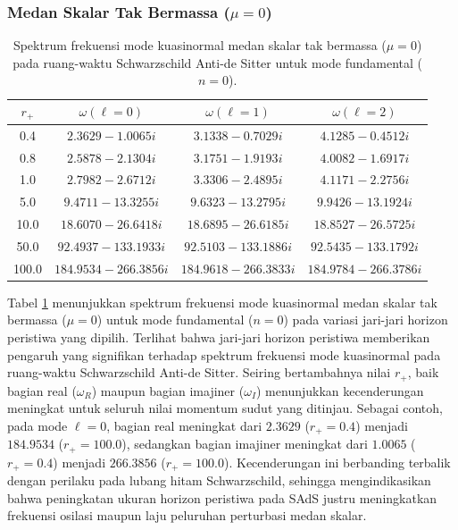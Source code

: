 \subsubsection*{Medan Skalar Tak Bermassa ($\mu=0$)}

\begin{table}[H]
\centering
\caption{Spektrum frekuensi mode kuasinormal medan skalar tak bermassa ($\mu=0$) pada ruang-waktu Schwarzschild Anti-de Sitter untuk mode fundamental ($n=0$).}
\vspace{0.2cm}
\renewcommand{\arraystretch}{1.25}
\begin{tabular}{cccc}
\toprule
$r_+$ & $\omega(\ell=0)$ & $\omega(\ell=1)$ & $\omega(\ell=2)$ \\
\midrule
0.4   & $2.3629 - 1.0065i$ & $3.1338 - 0.7029i$ & $4.1285 - 0.4512i$ \\
0.8   & $2.5878 - 2.1304i$ & $3.1751 - 1.9193i$ & $4.0082 - 1.6917i$ \\
1.0   & $2.7982 - 2.6712i$ & $3.3306 - 2.4895i$ & $4.1171 - 2.2756i$ \\
5.0   & $9.4711 - 13.3255i$ & $9.6323 - 13.2795i$ & $9.9426 - 13.1924i$ \\
10.0  & $18.6070 - 26.6418i$ & $18.6895 - 26.6185i$ & $18.8527 - 26.5725i$ \\
50.0  & $92.4937 - 133.1933i$ & $92.5103 - 133.1886i$ & $92.5435 - 133.1792i$ \\
100.0 & $184.9534 - 266.3856i$ & $184.9618 - 266.3833i$ & $184.9784 - 266.3786i$ \\
\bottomrule
\end{tabular}
\label{tab:sads_mu0_n0}
\end{table}

Tabel \ref{tab:sads_mu0_n0} menunjukkan spektrum frekuensi mode kuasinormal medan skalar tak bermassa ($\mu=0$) untuk mode fundamental ($n=0$) pada variasi jari-jari horizon peristiwa yang dipilih. Terlihat bahwa jari-jari horizon peristiwa memberikan pengaruh yang signifikan terhadap spektrum frekuensi mode kuasinormal pada ruang-waktu Schwarzschild Anti-de Sitter. Seiring bertambahnya nilai $r_+$, baik bagian real ($\omega_R$) maupun bagian imajiner ($\omega_I$) menunjukkan kecenderungan meningkat untuk seluruh nilai momentum sudut yang ditinjau. Sebagai contoh, pada mode $\ell=0$, bagian real meningkat dari $2.3629$ ($r_+=0.4$) menjadi $184.9534$ ($r_+=100.0$), sedangkan bagian imajiner meningkat dari $1.0065$ ($r_+ = 0.4$) menjadi $266.3856$ ($r_+ = 100.0$). Kecenderungan ini berbanding terbalik dengan perilaku pada lubang hitam Schwarzschild, sehingga mengindikasikan bahwa peningkatan ukuran horizon peristiwa pada SAdS justru meningkatkan frekuensi osilasi maupun laju peluruhan perturbasi medan skalar.

